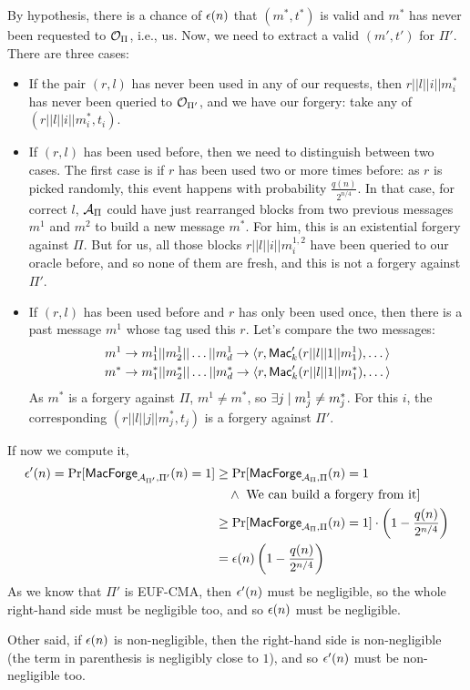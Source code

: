\begin{solution}
\begin{enumerate}[start=2]
		By hypothesis, there is a chance of $\epsilon(n)$ that $(m^*, t^*)$ is valid and $m^*$ has never been requested to $\mathcal{O}_\Pi$, i.e., us. Now, we need to extract a valid $(m', t')$ for $\Pi'$. There are three cases:
		\begin{itemize}
			\item If the pair $(r, l)$ has never been used in any of our requests, then $r||l||i||m_i^*$ has never been queried to $\mathcal{O}_{\Pi'}$, and we have our forgery: take any of $(r||l||i||m_i^*, t_i)$.
			\item If $(r, l)$ has been used before, then we need to distinguish between two cases. The first case is if $r$ has been used two or more times before: as $r$ is picked randomly, this event happens with probability $\frac{q(n)}{2^{n/4}}$. In that case, for correct $l$, $\mathcal{A}_\Pi$ could have just rearranged blocks from two previous messages $m^1$ and $m^2$ to build a new message $m^*$. For him, this is an existential forgery against $\Pi$. But for us, all those blocks $r||l||i||m_i^{1, 2}$ have been queried to our oracle before, and so none of them are fresh, and this is not a forgery against $\Pi'$.
			\item If $(r, l)$ has been used before and $r$ has only been used once, then there is a past message $m^1$ whose tag used this $r$. Let's compare the two messages:
			\begin{align*}
			m^1 &\rightarrow m_1^1||m_2^1||\dots||m_d^1 \rightarrow \langle r, \operatorname{\mathsf{Mac}}'_k(r||l||1||m_1^1), \dots\rangle \\
			m^* &\rightarrow m_1^*||m_2^*||\dots||m_d^* \rightarrow \langle r, \operatorname{\mathsf{Mac}}'_k(r||l||1||m_1^*), \dots\rangle
			\end{align*}
			As $m^*$ is a forgery against $\Pi$, $m^1 \neq m^*$, so $\exists j \suchthat m_j^1 \neq m_j^*$. For this $i$, the corresponding $(r||l||j||m_j^*, t_j)$ is a forgery against $\Pi'$.
		\end{itemize}
		If now we compute it,
		\begin{align*}
		\epsilon'(n) = \Pr[\mathsf{MacForge}_{\mathcal{A}_{\Pi'},\Pi'}(n)=1] &\ge \Pr[\mathsf{MacForge}_{\mathcal{A}_\Pi,\Pi}(n)=1 \\
		&\quad \wedge \text{ We can build a forgery from it}] \\
		&\ge \Pr[\mathsf{MacForge}_{\mathcal{A}_\Pi,\Pi}(n)=1] \cdot \left(1-\frac{q(n)}{2^{n/4}}\right) \\
		&= \epsilon(n) \left(1-\frac{q(n)}{2^{n/4}}\right)
		\end{align*}
		As we know that $\Pi'$ is EUF-CMA, then $\epsilon'(n)$ must be negligible, so the whole right-hand side must be negligible too, and so $\epsilon(n)$ must be negligible.

		Other said, if $\epsilon(n)$ is non-negligible, then the right-hand side is non-negligible (the term in parenthesis is negligibly close to $1$), and so $\epsilon'(n)$ must be non-negligible too.
	\end{enumerate}
\end{solution}



